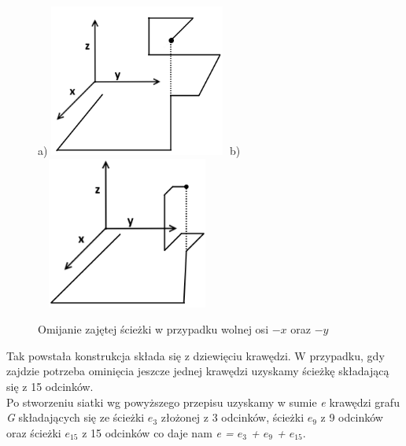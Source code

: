 \documentclass[brudnopis]{xmgr}
\begin{document}
\begin{figure}[ht!]
  \centering
  a)\includegraphics[width=6cm,height=5cm]{rysunki/zajete_z.png}
  b)\includegraphics[width=6cm,height=5cm]{rysunki/zajete_z2.png}
  \caption{Omijanie zajętej ścieżki w przypadku wolnej osi $-x$ oraz $-y$}
  \label{fig:nakladanie}
\end{figure} 
Tak powstała konstrukcja składa się z dziewięciu krawędzi. W przypadku, gdy zajdzie potrzeba ominięcia jeszcze jednej krawędzi uzyskamy ścieżkę składającą się z 15 odcinków.
\\\indent Po stworzeniu siatki wg powyższego przepisu uzyskamy w sumie \textit{e} krawędzi grafu \textit{G} składających się ze ścieżki $e_3$ złożonej z 3 odcinków, ścieżki $e_9$ z 9 odcinków oraz ścieżki $e_{15}$ z 15 odcinków co daje nam \textit{e = $e_3$ + $e_9$ + $e_{15}$}.
\end{document}
